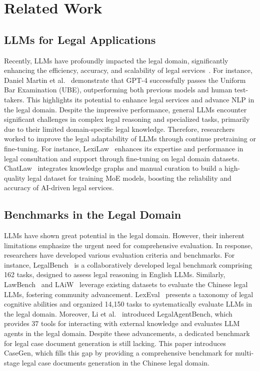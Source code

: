 \section{Related Work}

\subsection{LLMs for Legal Applications}
Recently, LLMs have profoundly impacted the legal domain, significantly enhancing the efficiency, accuracy, and scalability of legal services~\cite{lai2024large,li2024bladeenhancingblackboxlarge}. 
For instance, Daniel Martin et al.~\cite{katz2024gpt} demonstrate that GPT-4 successfully passes the Uniform Bar Examination (UBE), outperforming both previous models and human test-takers. This highlights its potential to enhance legal services and advance NLP in the legal domain.
Despite the impressive performance, general LLMs encounter significant challenges in complex legal reasoning and specialized tasks, primarily due to their limited domain-specific legal knowledge. 
Therefore, researchers worked to improve the legal adaptability of LLMs  through continue pretraining or fine-tuning. For instance, LexiLaw~\cite{LexiLaw} enhances its expertise and performance in legal consultation and support through fine-tuning on legal domain datasets. ChatLaw~\cite{cui2023chatlaw} integrates knowledge graphs and manual curation to build a high-quality legal dataset for training MoE models, boosting the reliability and accuracy of AI-driven legal services.


\subsection{Benchmarks in the Legal Domain}
LLMs have shown great potential in the legal domain. However, their inherent limitations emphasize the urgent need for comprehensive evaluation. In response, researchers have developed various evaluation criteria and benchmarks.
For instance, LegalBench~\cite{guha2024legalbench} is a collaboratively developed legal benchmark comprising 162 tasks, designed to assess legal reasoning in English LLMs.  Similarly, LawBench~\cite{fei2023lawbench} and LAiW~\cite{dai2023laiw} leverage existing datasets to evaluate the Chinese legal LLMs, fostering community advancement.
LexEval~\cite{lilexeval} presents a taxonomy of legal cognitive abilities and organized 14,150 tasks to systematically evaluate LLMs in the legal domain.
Moreover, Li et al.~\cite{li2024legalagentbench} introduced LegalAgentBench, which provides 37 tools for interacting with external knowledge and evaluates LLM agents in the legal domain. 
Despite these advancements, a dedicated benchmark for legal case document generation is still lacking.
This paper introduces CaseGen, which fills this gap by providing a comprehensive benchmark for multi-stage legal case documents generation in the Chinese legal domain.
